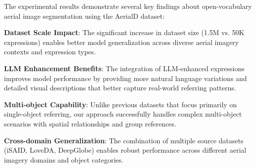 The experimental results demonstrate several key findings about open-vocabulary aerial image segmentation using the AerialD dataset:

\textbf{Dataset Scale Impact}: The significant increase in dataset size (1.5M vs. 50K expressions) enables better model generalization across diverse aerial imagery contexts and expression types.

\textbf{LLM Enhancement Benefits}: The integration of LLM-enhanced expressions improves model performance by providing more natural language variations and detailed visual descriptions that better capture real-world referring patterns.

\textbf{Multi-object Capability}: Unlike previous datasets that focus primarily on single-object referring, our approach successfully handles complex multi-object scenarios with spatial relationships and group references.

\textbf{Cross-domain Generalization}: The combination of multiple source datasets (iSAID, LoveDA, DeepGlobe) enables robust performance across different aerial imagery domains and object categories.
